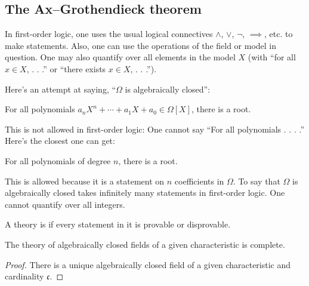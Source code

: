 \documentclass[11pt, oneside,margin=1in]{article}
\begin{document}
\subsection{The Ax--Grothendieck theorem}

\begin{remark}
	 In first-order logic, one uses the usual logical connectives $\land$, $\lor$, $\lnot$, $\implies$, etc. to make statements. Also, one can use the operations of the field or model in question. One may also quantify over all elements in the model $X$ (with ``for all $x\in X$, . . .'' or ``there exists $x\in X$, . . .'').

	Here's an attempt at saying, ``$\Omega$ is algebraically closed'':
	\begin{center}
		\small For all polynomials $a_nX^n + \cdots + a_1X + a_0\in \Omega[X]$, there is a root.
	\end{center}
	This is not allowed in first-order logic: One cannot say ``For all polynomials . . . .'' Here's the closest one can get:
	\begin{center}
		\small For all polynomials of degree $n$, there is a root.
	\end{center}
	This is allowed because it is a statement on $n$ coefficients in $\Omega$. To say that $\Omega$ is algebraically closed takes infinitely many statements in first-order logic. One cannot quantify over all integers.
\end{remark}
\begin{definition}[ ]\label{}\text{}
A theory is  if every statement in it is provable or disprovable.
\end{definition}

\begin{proposition}[ ]\label{}\text{}
The theory of algebraically closed fields of a given characteristic is complete.
\end{proposition}

\begin{proof}
There is a unique algebraically closed field of a given characteristic and cardinality $\mathfrak{c}$.
\end{proof}
\end{document}
